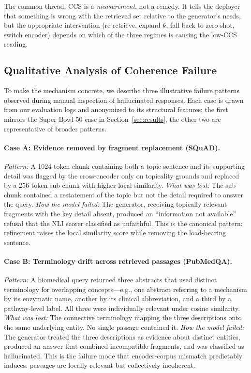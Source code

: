 The common thread: CCS is a \emph{measurement}, not a remedy. It
tells the deployer that something is wrong with the retrieved set
relative to the generator's needs, but the appropriate intervention
(re-retrieve, expand $k$, fall back to zero-shot, switch encoder)
depends on which of the three regimes is causing the low-CCS reading.

\subsection{Qualitative Analysis of Coherence Failure}
\label{sec:qualitative}

To make the mechanism concrete, we describe three illustrative failure
patterns observed during manual inspection of hallucinated responses.
Each case is drawn from our evaluation logs and anonymized to its
structural features; the first mirrors the Super Bowl 50 case in
Section~\ref{sec:results}, the other two are representative of broader
patterns.

\paragraph{Case A: Evidence removed by fragment replacement (SQuAD).}
\emph{Pattern:} A 1024-token chunk containing both a topic sentence and
its supporting detail was flagged by the cross-encoder only on topicality
grounds and replaced by a 256-token sub-chunk with higher local similarity.
\emph{What was lost:} The sub-chunk contained a restatement of the topic
but not the detail required to answer the query.
\emph{How the model failed:} The generator, receiving topically relevant
fragments with the key detail absent, produced an ``information not
available'' refusal that the NLI scorer classified as unfaithful. This is
the canonical pattern: refinement raises the local similarity score while
removing the load-bearing sentence.

\paragraph{Case B: Terminology drift across retrieved passages (PubMedQA).}
\emph{Pattern:} A biomedical query returned three abstracts that used
distinct terminology for overlapping concepts---e.g., one abstract
referring to a mechanism by its enzymatic name, another by its clinical
abbreviation, and a third by a pathway-level label. All three were
individually relevant under cosine similarity.
\emph{What was lost:} The connective terminology mapping the three
descriptions onto the same underlying entity. No single passage contained
it.
\emph{How the model failed:} The generator treated the three descriptions
as evidence about distinct entities, produced an answer that combined
incompatible fragments, and was classified as hallucinated. This is the
failure mode that encoder-corpus mismatch predictably induces: passages
are locally relevant but collectively incoherent.

